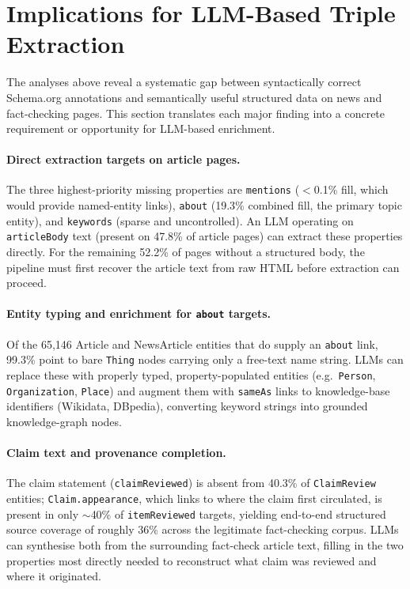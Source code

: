 \documentclass[11pt,a4paper]{article}
\begin{document}
\section{Implications for LLM-Based Triple Extraction}
\label{sec:implications}

The analyses above reveal a systematic gap between syntactically correct
Schema.org annotations and semantically useful structured data on news and
fact-checking pages.  This section translates each major finding into a
concrete requirement or opportunity for LLM-based enrichment.

\paragraph{Direct extraction targets on article pages.}
The three highest-priority missing properties are \texttt{mentions}
($<$0.1\% fill, which would provide named-entity links), \texttt{about}
(19.3\% combined fill, the primary topic entity), and \texttt{keywords}
(sparse and uncontrolled).  An LLM operating on \texttt{articleBody}
text (present on 47.8\% of article pages) can extract these
properties directly.  For the remaining 52.2\% of pages without a
structured body, the pipeline must first recover the article text from
raw HTML before extraction can proceed.

\paragraph{Entity typing and enrichment for \texttt{about} targets.}
Of the 65{,}146 Article and NewsArticle entities that do supply an
\texttt{about} link, 99.3\% point to bare \texttt{Thing} nodes carrying
only a free-text name string.  LLMs can replace these with properly
typed, property-populated entities (e.g.\ \texttt{Person},
\texttt{Organization}, \texttt{Place}) and augment them with
\texttt{sameAs} links to knowledge-base identifiers (Wikidata, DBpedia),
converting keyword strings into grounded knowledge-graph nodes.

\paragraph{Claim text and provenance completion.}
The claim statement (\texttt{claimReviewed}) is absent from 40.3\% of
\texttt{ClaimReview} entities; \texttt{Claim.appearance}, which links to
where the claim first circulated, is present in only $\sim$40\% of
\texttt{itemReviewed} targets, yielding end-to-end structured source
coverage of roughly 36\% across the legitimate fact-checking corpus.
LLMs can synthesise both from the surrounding fact-check article text,
filling in the two properties most directly needed to reconstruct what
claim was reviewed and where it originated.
\end{document}
